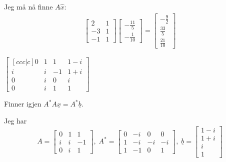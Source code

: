 \documentclass[11pt, a4paper, norsk]{NTNUoving}
\begin{document}
\begin{oppgave}
\begin{punkt}
           Jeg må nå finne $A\hat{x}$:
           \begin{align*}
               \begin{bmatrix}
                   2 & 1 \\
                   -3 & 1 \\
                   -1 & 1
               \end{bmatrix}\begin{bmatrix}
                   -\frac{11}{5} \\
                   -\frac{1}{10}
               \end{bmatrix} = \begin{bmatrix}
                   -\frac{9}{2} \\
                   \frac{33}{5} \\
                   \frac{21}{10}
               \end{bmatrix}
           \end{align*}
           
       \end{punkt}
        \begin{punkt}
            $\begin{bmatrix}[ccc|c]
                0 & 1 & 1 & 1-i \\
                i & i & -1 & 1+i \\
                0 & i & 0 & i \\
                0 & i & 1 & 1
            \end{bmatrix}$

            Finner igjen $A^{*}A\underline{x} = A^{*}\underline{b}$.
            
            Jeg har \[ A = \begin{bmatrix}
                0 & 1 & 1 \\
                i & i & -1 \\
                0 & i & 1
            \end{bmatrix}, \; A^{*} = \begin{bmatrix}
                0 & -i & 0 & 0 \\
                1 & -i & -i & -i \\
                1 & -1 & 0 & 1
            \end{bmatrix}, \; \underline{b} = \begin{bmatrix}
                1-i \\
                1+i \\
                i \\
                1
            \end{bmatrix}\]


\end{punkt}
\end{oppgave}
\end{document}
